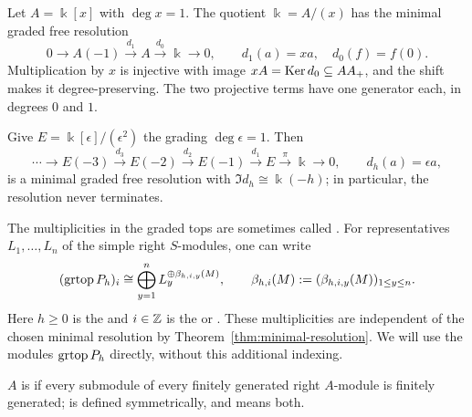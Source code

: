 \begin{example}\label{ex:minimal-polynomial}
Let $A=\Bbbk[x]$ with $\deg x=1$.
The quotient $\Bbbk=A/(x)$ has the minimal graded free resolution
\[
0\longrightarrow A(-1)\xrightarrow{d_1}A\xrightarrow{d_0}\Bbbk
\longrightarrow0,\qquad d_1(a)=xa,\quad d_0(f)=f(0).
\]
Multiplication by $x$ is injective with image $xA=\operatorname{Ker}\nolimits d_0\subseteq AA_+$, and the shift makes it degree-preserving.
The two projective terms have one generator each, in degrees $0$ and $1$.
\end{example}

\begin{example}\label{ex:minimal-exterior}
Give $E=\Bbbk[\epsilon]/(\epsilon^2)$ the grading $\deg\epsilon=1$.
Then
\[
\cdots\longrightarrow E(-3)\xrightarrow{d_3}E(-2)
\xrightarrow{d_2}E(-1)\xrightarrow{d_1}E\xrightarrow{\pi}\Bbbk
\longrightarrow0,
\qquad d_h(a)=\epsilon a,
\]
is a minimal graded free resolution with $\Im d_h\cong \Bbbk (-h)$; in particular, the resolution never terminates.
\end{example}

\begin{advanced}
\begin{remark}\label{not:graded-betti}
The multiplicities in the graded tops are sometimes called .
For representatives $L_1,\ldots,L_n$ of the simple right $S$-modules, one can write
\[
(\operatorname{grtop}\nolimits P_h)_i\cong\bigoplus_{y=1}^nL_y^{\oplus\beta_{h,i,y}(M)},
\qquad
\beta_{h,i}(M):=(\beta_{h,i,y}(M))_{1\leq y\leq n}.
\]
Here $h\geq0$ is the  and $i\in\mathbb{Z}$ is the  or .
These multiplicities are independent of the chosen minimal resolution by Theorem~\ref{thm:minimal-resolution}.
We will use the modules $\operatorname{grtop}\nolimits P_h$ directly, without this additional indexing.
\end{remark}
\end{advanced}

\begin{definition}\label{def:noetherian-algebra}
$A$ is  if every submodule of every finitely generated right $A$-module is finitely generated;  is defined symmetrically, and  means both.
\end{definition}

